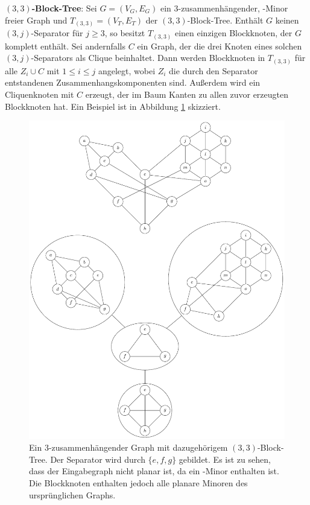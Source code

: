 \textbf{$(3, 3)$-Block-Tree}: Sei $G = (V_G, E_G)$ ein $3$-zusammenhängender, \kf-Minor freier Graph und $T_{(3, 3)} = (V_T, E_T)$ der $(3, 3)$-Block-Tree.
Enthält $G$ keinen $(3, j)$-Separator für $j \geq 3$, so besitzt $T_{(3, 3)}$ einen einzigen Blockknoten, der $G$ komplett enthält.
Sei andernfalls $C$ ein Graph, der die drei Knoten eines solchen $(3, j)$-Separators als Clique beinhaltet.
Dann werden Blockknoten in $T_{(3, 3)}$ für alle $Z_i \cup C$ mit $1 \leq i \leq j$ angelegt, wobei $Z_i$ die durch den Separator entstandenen Zusammenhangskomponenten sind.
Außerdem wird ein Cliquenknoten mit $C$ erzeugt, der im Baum Kanten zu allen zuvor erzeugten Blockknoten hat.
Ein Beispiel ist in Abbildung \ref{fig:33-Block-Tree} skizziert.
\begin{figure}[H]
  \centering
  \includegraphics[width=\textwidth,height=\textheight,keepaspectratio]{bilder/33-Block-Tree.pdf}
  \caption{Ein $3$-zusammenhängender Graph mit dazugehörigem $(3, 3)$-Block-Tree.
           Der Separator wird durch $\{e, f, g\}$ gebildet.
           Es ist zu sehen, dass der Eingabegraph nicht planar ist, da ein \kdd-Minor enthalten ist.
           Die Blockknoten enthalten jedoch alle planare Minoren des ursprünglichen Graphs.}
  \label{fig:33-Block-Tree}
\end{figure}


